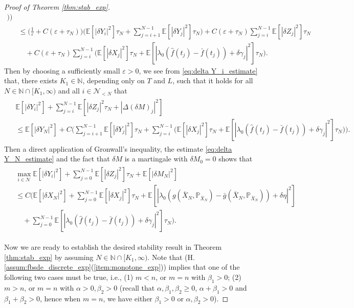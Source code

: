 \documentclass[11pt]{article}
\numberwithin{equation}{section}
\theoremstyle{definition}
\theoremstyle{remark}
\def\l{\label}  \def\f{\frac}  \def\fa{\forall}
\def\b{\beta}  \def\a{\alpha} \def\ga{\gamma}
\def\eps{\varepsilon}
\def\cN{\mathcal{N}}
\def\sE{{\mathbb{E}}}
\def\sN{{\mathbb{N}}}
\def\sP{\mathbb{P}}
\begin{document}
\begin{proof}[Proof of Theorem \ref{thm:stab_exp}]
\begin{align*}
 \big)
 \bigg)
 \\
  &\le 
\big( \tfrac{1}{\eps}+C(\eps+\tau_N)\big)
\bigg( \sE[|\delta Y_{i}|^2]\tau_N+\sum_{j=i+1}^{N-1}  \sE[|\delta Y_{j}|^2]\tau_N\bigg)+
C(\eps+\tau_N)
\sum_{j=i}^{N-1}\sE[|\delta Z_{j}|^2]\tau_N
\\
&\quad +
C(\eps+\tau_N)\sum_{j=i}^{N-1} 
\big(
 \sE[|\delta X_{j}|^2]\tau_N
+\sE[|\lambda_0(\hat{f}(t_{j})-\bar{f}(t_{j}))+\delta \gamma_j|^2]\tau_N
 \big).
\end{align*}
Then by   choosing a sufficiently small  $\eps>0$,
we see from \eqref{eq:delta Y_i_estimate} that,  there exists $K_1\in \sN$, 
depending only on $T$ and $L$, such that it holds for all $N\in \sN\cap[K_1,\infty)$
and  all $i\in \cN_{<N}$ that
\begin{align*}
\begin{split}
&\sE[|\delta Y_{i}|^2]+\sum_{j=i}^{N-1}\sE[| \delta {Z}_j|^2\tau_N+|\Delta  (\delta {M})_j|^2]
\\
&\le
\sE[|\delta Y_{N}|^2]
+
 C\bigg(
\sum_{j=i+1}^{N-1}  \sE[|\delta Y_{j}|^2]\tau_N+
\sum_{j=i}^{N-1} 
\big(
 \sE[|\delta X_{j}|^2]\tau_N
+\sE[|\lambda_0(\hat{f}(t_{j})-\bar{f}(t_{j}))+\delta \gamma_j|^2]\tau_N
 \big)
 \bigg).
   \end{split}
\end{align*}
Then a direct application of Gronwall's inequality,
 the estimate \eqref{eq:delta Y_N_estimate}
 and the fact that $\delta M$ is a martingale with $\delta M_0=0$
 shows that
\begin{align}\l{eq:deltaYZ_stab}
\begin{split}
&\max_{i\in \cN}\sE[|\delta Y_i|^2]+\sum_{j=0}^{N-1}\sE[| \delta {Z}_j|^2]\tau_N+\sE[|\delta {M}_N|^2]
\\
&\le
 C\bigg(
 \sE[|\delta {X}_{N}|^2]+
 \sum_{j=0}^{N-1}  \sE[|\delta X_{j}|^2]\tau_N
 +
 \sE[|\lambda_0(g(\bar{X}_N,\sP_{\bar{X}_N})-\bar{g}(\bar{X}_N,\sP_{\bar{X}_N}))
+\delta \eta
|^2]
\\
&\quad
+
 \sum_{j=0}^{N-1}
\sE[|\lambda_0(\hat{f}(t_{j})-\bar{f}(t_{j}))+\delta \gamma_j|^2]\tau_N
 \bigg).
   \end{split}
\end{align}

Now we are ready to establish the desired stability result in  Theorem \ref{thm:stab_exp}
by assuming $N\in \sN\cap[K_1,\infty)$.
Note that (H.\ref{assum:fbsde_discrete_exp}(\ref{item:monotone_exp})) implies that one of the following two cases must be true, i.e., 
(1) $m< n$,  or $m=n$ with $\beta_1>0$;
 (2)
$m> n$, or $m=n$ with $\a>0,\beta_2>0$
(recall that $\a,\beta_1,\beta_2\ge 0$, $\a+\b_1>0$ and $\beta_1+\beta_2>0$, 
hence  when $m=n$, we have
 either $\beta_1>0$ or $\a,\b_2>0$).
 

\end{proof}
\end{document}
